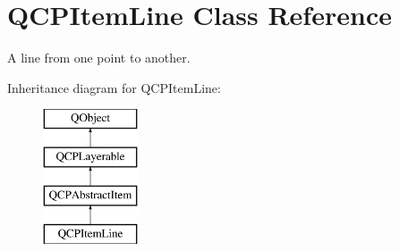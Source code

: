 \hypertarget{class_q_c_p_item_line}{}\section{Q\+C\+P\+Item\+Line Class Reference}
\label{class_q_c_p_item_line}


A line from one point to another.  


Inheritance diagram for Q\+C\+P\+Item\+Line\+:\begin{figure}[H]
\begin{center}
\leavevmode
\includegraphics[height=4.000000cm]{class_q_c_p_item_line}
\end{center}
\end{figure}

